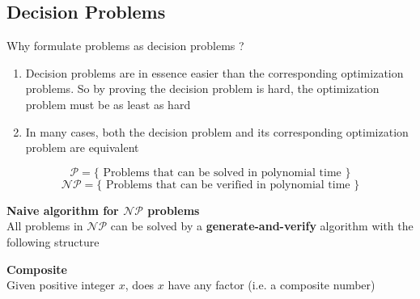 \documentclass[11pt]{article}
\begin{document}
\subsection*{Decision Problems}

\begin{center}
    Why formulate problems as decision problems ?
\end{center}
\begin{enumerate}
    \item Decision problems are in essence easier than the corresponding optimization problems. So by proving the decision problem is hard, the optimization problem must be as least as hard 
    \item In many cases, both the decision problem and its corresponding optimization problem are equivalent
\end{enumerate}

\[
    \mathcal{P} = \{ \text{ Problems that can be solved in polynomial time } \}
\]
\[
    \mathcal{NP} = \{ \text{ Problems that can be verified in polynomial time } \}
\]

\begin{proposition*} \textbf{Naive algorithm for $\mathcal{NP}$ problems} \\
    All problems in $\mathcal{NP}$ can be solved by a \textbf{generate-and-verify} algorithm with the following structure 

    \begin{algorithm}[H]

    \end{algorithm}
\end{proposition*}


\begin{example} \textbf{Composite} \\ 
    Given positive integer $x$, does $x$ have any factor (i.e. a composite number)

    \begin{algorithm}[H]

    \end{algorithm}
\end{example}
\end{document}
